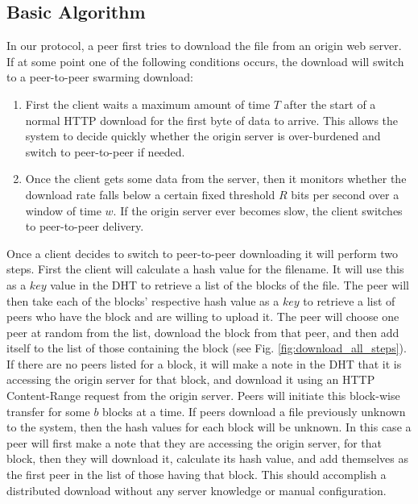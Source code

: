 

\subsection{Basic Algorithm}

In our protocol, a peer first tries to download the file from an origin web server.  If at some point one of the following conditions occurs, the download will switch to a peer-to-peer swarming download:
\begin{enumerate}
\item First the client waits a maximum amount of time $T$ after the start of a normal HTTP download for the first byte of data to arrive.  This allows the system to decide quickly whether the origin server is over-burdened and switch to peer-to-peer if needed.   
\item Once the client gets some data from the server, then it monitors whether the download rate falls below a certain fixed threshold $R$ bits per second over a window of time $w$.  If the origin server ever becomes slow, the client switches to peer-to-peer delivery.
\end{enumerate}

Once a client decides to switch to peer-to-peer downloading it will perform two steps.  First the client will calculate a hash value for the filename.  It will use this as a $key$ value in the DHT to retrieve a list of the blocks of the file.  The peer will then take each of the blocks' respective hash value as a $key$ to retrieve a list of peers who have the block and are willing to upload it.  The peer will choose one peer at random from the list, download the block from that peer, and then add itself to the list of those containing the block (see Fig. \ref{fig:download_all_steps}).  If there are no peers listed for a block, it will make a note in the DHT that it is accessing the origin server for that block, and download it using an HTTP Content-Range request from the origin server.  Peers will initiate this block-wise transfer for some $b$ blocks at a time.  If peers download a file previously unknown to the system, then the hash values for each block will be unknown.  In this case a peer will first make a note that they are accessing the origin server, for that block, then they will download it, calculate its hash value, and add themselves as the first peer in the list of those having that block.  This should accomplish a distributed download without any server knowledge or manual configuration.

